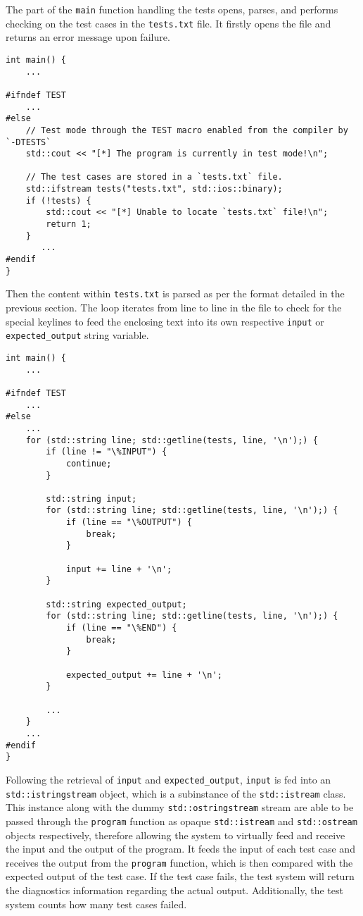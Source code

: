 \documentclass[12pt]{article}
\begin{document}
The part of the \texttt{main} function handling the tests opens, parses, and performs checking on the test cases in the \texttt{tests.txt} file. It firstly opens the file and returns an error message upon failure.

\begin{verbatim}
int main() {
    ...

#ifndef TEST
    ...
#else
    // Test mode through the TEST macro enabled from the compiler by `-DTESTS`
    std::cout << "[*] The program is currently in test mode!\n";

    // The test cases are stored in a `tests.txt` file.
    std::ifstream tests("tests.txt", std::ios::binary);
    if (!tests) {
        std::cout << "[*] Unable to locate `tests.txt` file!\n";
        return 1;
    }
       ...
#endif
}
\end{verbatim}
\pagebreak

Then the content within \texttt{tests.txt} is parsed as per the format detailed in the previous section. The loop iterates from line to line in the file to check for the special keylines to feed the enclosing text into its own respective \texttt{input} or \texttt{expected\_output} string variable.

\begin{verbatim}
int main() {
    ...

#ifndef TEST
    ...
#else
    ...
    for (std::string line; std::getline(tests, line, '\n');) {
        if (line != "\%INPUT") {
            continue;
        }

        std::string input;
        for (std::string line; std::getline(tests, line, '\n');) {
            if (line == "\%OUTPUT") {
                break;
            }

            input += line + '\n';
        }

        std::string expected_output;
        for (std::string line; std::getline(tests, line, '\n');) {
            if (line == "\%END") {
                break;
            }

            expected_output += line + '\n';
        }

		...
    }
	...
#endif
}
\end{verbatim}
\pagebreak

Following the retrieval of \texttt{input} and \texttt{expected\_output}, \texttt{input} is fed into an \texttt{std::istringstream} object, which is a subinstance of the \texttt{std::istream} class. This instance along with the dummy \texttt{std::ostringstream} stream are able to be passed through the \texttt{program} function as opaque \texttt{std::istream} and \texttt{std::ostream} objects respectively, therefore allowing the system to virtually feed and receive the input and the output of the program. It feeds the input of each test case and receives the output from the \texttt{program} function, which is then compared with the expected output of the test case. If the test case fails, the test system will return the diagnostics information regarding the actual output. Additionally, the test system counts how many test cases failed.
\end{document}

